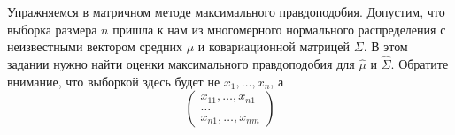 \begin{problem}{}
	Упражняемся в матричном методе максимального правдоподобия.  Допустим, что выборка размера $n$ пришла к нам из многомерного нормального распределения с неизвестными вектором средних $\mu$ и ковариационной матрицей $\Sigma$. В этом задании нужно найти оценки максимального правдоподобия для $\hat \mu$ и $\hat \Sigma$.  Обратите внимание, что выборкой здесь будет не $x_1, \ldots, x_n$, а 
	\begin{equation*}
	\begin{pmatrix}
	x_{11}, \ldots, x_{n1} \\
	\ldots  \\ 
	x_{n1}, \ldots, x_{nm}
	\end{pmatrix}
	\end{equation*}
\end{problem}
